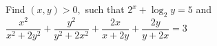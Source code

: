 Find $(x,y)>0,$ such that $2^x +\log_2 y=5$ and $\dfrac{x^2}{x^2 +2y^2} +\dfrac{y^2}{y^2 +2x^2} +\dfrac{2x}{x+2y} +\dfrac{2y}{y+2x}=3$
